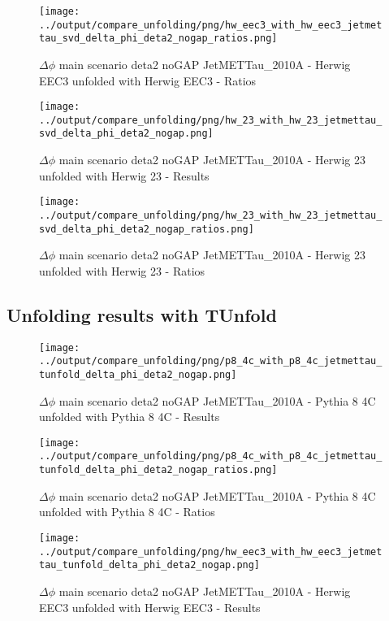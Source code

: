 \documentclass[11pt]{book}
\begin{document}
\begin{figure}[ht]
\centering
\texttt{[image: ../output/compare\_unfolding/png/hw\_eec3\_with\_hw\_eec3\_jetmettau\_svd\_delta\_phi\_deta2\_nogap\_ratios.png]}
\caption{$\Delta\phi$ main scenario deta2 noGAP JetMETTau\_2010A - Herwig EEC3 unfolded with Herwig EEC3 - Ratios}
\label{hw_eec3_hw_eec3_jetmettau_svd_delta_phi_deta2_nogap_b}
\end{figure}

\begin{figure}[ht]
\centering
\texttt{[image: ../output/compare\_unfolding/png/hw\_23\_with\_hw\_23\_jetmettau\_svd\_delta\_phi\_deta2\_nogap.png]}
\caption{$\Delta\phi$ main scenario deta2 noGAP JetMETTau\_2010A - Herwig 23 unfolded with Herwig 23 - Results}
\label{hw_23_hw_23_jetmettau_svd_delta_phi_deta2_nogap_a}
\end{figure}

\begin{figure}[ht]
\centering
\texttt{[image: ../output/compare\_unfolding/png/hw\_23\_with\_hw\_23\_jetmettau\_svd\_delta\_phi\_deta2\_nogap\_ratios.png]}
\caption{$\Delta\phi$ main scenario deta2 noGAP JetMETTau\_2010A - Herwig 23 unfolded with Herwig 23 - Ratios}
\label{hw_23_hw_23_jetmettau_svd_delta_phi_deta2_nogap_b}
\end{figure}


\clearpage
\subsection{Unfolding results with TUnfold}

\begin{figure}[ht]
\centering
\texttt{[image: ../output/compare\_unfolding/png/p8\_4c\_with\_p8\_4c\_jetmettau\_tunfold\_delta\_phi\_deta2\_nogap.png]}
\caption{$\Delta\phi$ main scenario deta2 noGAP JetMETTau\_2010A - Pythia 8 4C unfolded with Pythia 8 4C - Results}
\label{p8_p8_jetmettau_tunfold_delta_phi_deta2_nogap_a}
\end{figure}

\begin{figure}[ht]
\centering
\texttt{[image: ../output/compare\_unfolding/png/p8\_4c\_with\_p8\_4c\_jetmettau\_tunfold\_delta\_phi\_deta2\_nogap\_ratios.png]}
\caption{$\Delta\phi$ main scenario deta2 noGAP JetMETTau\_2010A - Pythia 8 4C unfolded with Pythia 8 4C - Ratios}
\label{p8_p8_jetmettau_tunfold_delta_phi_deta2_nogap_b}
\end{figure}

\begin{figure}[ht]
\centering
\texttt{[image: ../output/compare\_unfolding/png/hw\_eec3\_with\_hw\_eec3\_jetmettau\_tunfold\_delta\_phi\_deta2\_nogap.png]}
\caption{$\Delta\phi$ main scenario deta2 noGAP JetMETTau\_2010A - Herwig EEC3 unfolded with Herwig EEC3 - Results}
\label{hw_eec3_hw_eec3_jetmettau_tunfold_delta_phi_deta2_nogap_a}
\end{figure}
\end{document}
